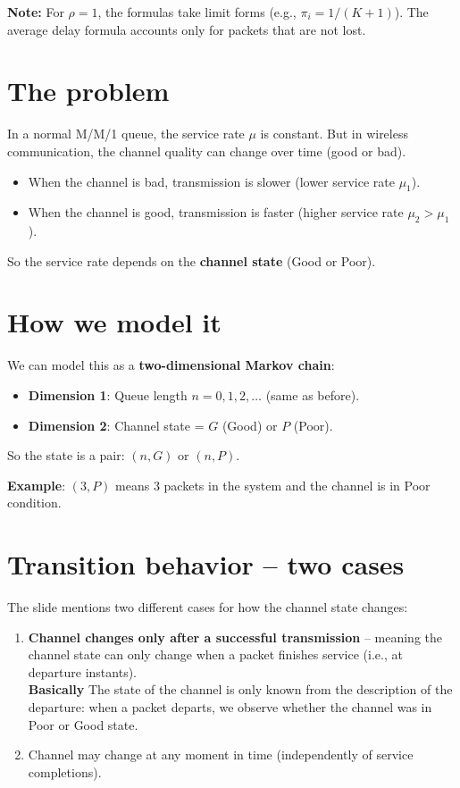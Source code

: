 \noindent
\textbf{Note:} For \(\rho = 1\), the formulas take limit forms (e.g., \(\pi_i = 1/(K+1)\)). The average delay formula accounts only for packets that are not lost.


\section*{The problem}

In a normal M/M/1 queue, the service rate \(\mu\) is constant.  
But in wireless communication, the channel quality can change over time (good or bad).  
\begin{itemize}
    \item When the channel is bad, transmission is slower (lower service rate \(\mu_1\)).
    \item When the channel is good, transmission is faster (higher service rate \(\mu_2 > \mu_1\)).
\end{itemize}
So the service rate depends on the \textbf{channel state} (Good or Poor).

\section*{How we model it}

We can model this as a \textbf{two-dimensional Markov chain}:

\begin{itemize}
    \item \textbf{Dimension 1}: Queue length \(n = 0, 1, 2, \dots\) (same as before).
    \item \textbf{Dimension 2}: Channel state = \(G\) (Good) or \(P\) (Poor).
\end{itemize}

So the state is a pair: \((n, G)\) or \((n, P)\).

\noindent
\textbf{Example}: \((3, P)\) means 3 packets in the system and the channel is in Poor condition.

\section*{Transition behavior – two cases}

The slide mentions two different cases for how the channel state changes:

\begin{enumerate}
    \item \textbf{Channel changes only after a successful transmission} – meaning the channel state can only change when a packet finishes service (i.e., at departure instants).\\
    \textbf{Basically} The state of the channel is only known from the description of the departure: when a packet departs, we observe whether the channel was in Poor or Good state.
    
    \item Channel may change at any moment in time (independently of service completions).
\end{enumerate}

